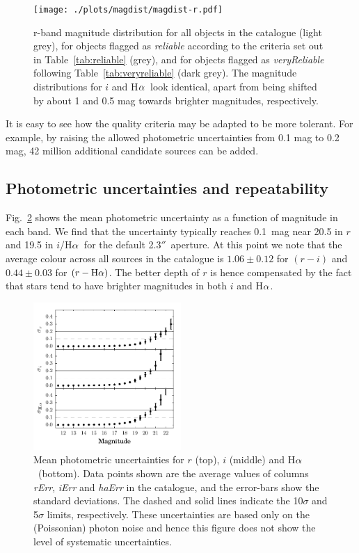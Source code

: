 \documentclass[useAMS,usenatbib]{mn2e}
\def\ha{\mbox{H$\rm \alpha$}}
\def\arcsec{$''$}
\begin{document}
\begin{figure}
    \texttt{[image: ./plots/magdist/magdist-r.pdf]} 
    \caption{r-band magnitude distribution for all objects in the catalogue 
    (light grey), for objects flagged as \emph{reliable} 
    according to the criteria set out in Table~\ref{tab:reliable} (grey),
    and for objects flagged as \emph{veryReliable} 
    following Table~\ref{tab:veryreliable} (dark grey).
    The magnitude distributions for $i$ and \ha\
    look identical, apart from being shifted
    by about 1 and 0.5 mag towards brighter magnitudes,
    respectively.}
    \label{fig:magdist}
\end{figure}

It is easy to see how the quality criteria
may be adapted to be more tolerant.
For example, by raising the allowed photometric uncertainties
from 0.1 mag to 0.2 mag,
42 million additional candidate sources can be added.

\subsection{Photometric uncertainties and repeatability}

Fig.~\ref{fig:uncertainties} shows the mean photometric
uncertainty as a function of magnitude in each band.
We find that the uncertainty typically
reaches 0.1~mag near 20.5 in $r$ 
and 19.5 in $i$/\ha\ for the default 2.3\arcsec\ aperture.
At this point we note that the average colour
across all sources in the catalogue is
$1.06\pm0.12$ for $(r-i)$ and $0.44\pm0.03$ for $(r-\ha)$.
The better depth of $r$ is hence compensated
by the fact that stars tend to have 
brighter magnitudes in both $i$ and \ha.

\begin{figure}
    \includegraphics[width=0.5\textwidth]{figures/uncertainties/uncertainties.pdf} 
    \caption{Mean photometric uncertainties
             for $r$ (top), $i$ (middle) and \ha\ (bottom).
             Data points shown are the average values of
             columns \emph{rErr}, \emph{iErr} and \emph{haErr}
             in the catalogue, 
             and the error-bars show the standard deviations.
             The dashed and solid lines indicate 
             the 10$\sigma$ and 5$\sigma$ limits, respectively.
             These uncertainties are based only on the (Poissonian)
             photon noise and hence this figure does not show
             the level of systematic uncertainties.}
    \label{fig:uncertainties}
\end{figure}
\end{document}
